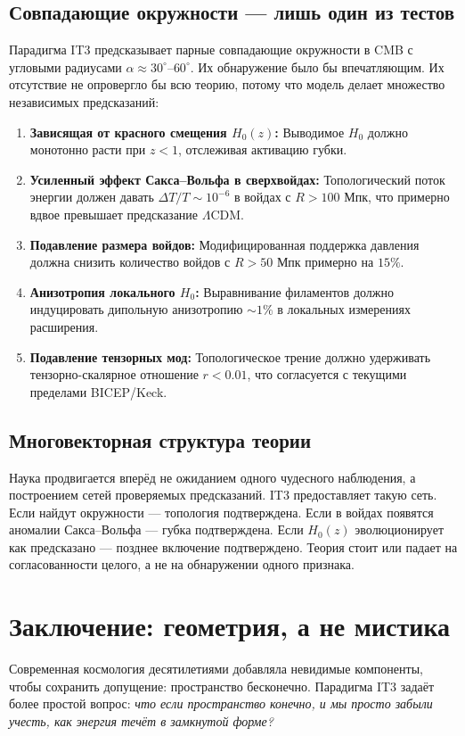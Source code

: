 \documentclass[12pt,a4paper]{report}
\begin{document}
\section{Совпадающие окружности — лишь один из тестов}
Парадигма IT3 предсказывает парные совпадающие окружности в CMB с угловыми радиусами $\alpha \approx 30^\circ\text{--}60^\circ$. Их обнаружение было бы впечатляющим. Их отсутствие не опровергло бы всю теорию, потому что модель делает множество независимых предсказаний:
\begin{enumerate}
    \item \textbf{Зависящая от красного смещения $H_0(z)$:} Выводимое $H_0$ должно монотонно расти при $z < 1$, отслеживая активацию губки.
    \item \textbf{Усиленный эффект Сакса–Вольфа в сверхвойдах:} Топологический поток энергии должен давать $\Delta T/T \sim 10^{-6}$ в войдах с $R > 100$ Мпк, что примерно вдвое превышает предсказание $\Lambda$CDM.
    \item \textbf{Подавление размера войдов:} Модифицированная поддержка давления должна снизить количество войдов с $R > 50$ Мпк примерно на $15\%$.
    \item \textbf{Анизотропия локального $H_0$:} Выравнивание филаментов должно индуцировать дипольную анизотропию $\sim 1\%$ в локальных измерениях расширения.
    \item \textbf{Подавление тензорных мод:} Топологическое трение должно удерживать тензорно-скалярное отношение $r < 0.01$, что согласуется с текущими пределами BICEP/Keck.
\end{enumerate}

\section{Многовекторная структура теории}
Наука продвигается вперёд не ожиданием одного чудесного наблюдения, а построением сетей проверяемых предсказаний. IT3 предоставляет такую сеть. Если найдут окружности — топология подтверждена. Если в войдах появятся аномалии Сакса–Вольфа — губка подтверждена. Если $H_0(z)$ эволюционирует как предсказано — позднее включение подтверждено. Теория стоит или падает на согласованности целого, а не на обнаружении одного признака.

\chapter{Заключение: геометрия, а не мистика}
Современная космология десятилетиями добавляла невидимые компоненты, чтобы сохранить допущение: пространство бесконечно. Парадигма IT3 задаёт более простой вопрос: \textit{что если пространство конечно, и мы просто забыли учесть, как энергия течёт в замкнутой форме?}
\end{document}
